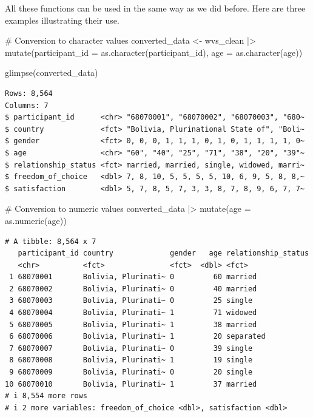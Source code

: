 \documentclass[
  letterpaper,
  DIV=11,
  numbers=noendperiod]{scrreprt}
\newenvironment{Shaded}{\begin{snugshade}}{\end{snugshade}}
\newcommand{\AttributeTok}[1]{\textcolor[rgb]{0.40,0.45,0.13}{#1}}
\newcommand{\CommentTok}[1]{\textcolor[rgb]{0.37,0.37,0.37}{#1}}
\newcommand{\FunctionTok}[1]{\textcolor[rgb]{0.28,0.35,0.67}{#1}}
\newcommand{\NormalTok}[1]{\textcolor[rgb]{0.00,0.23,0.31}{#1}}
\newcommand{\OtherTok}[1]{\textcolor[rgb]{0.00,0.23,0.31}{#1}}
\newcommand{\SpecialCharTok}[1]{\textcolor[rgb]{0.37,0.37,0.37}{#1}}
\begin{document}
All these functions can be used in the same way as we did before. Here
are three examples illustrating their use.

\begin{Shaded}
\begin{Highlighting}[]
\CommentTok{\# Conversion to character values}
\NormalTok{converted\_data }\OtherTok{\textless{}{-}}
\NormalTok{  wvs\_clean }\SpecialCharTok{|\textgreater{}}
  \FunctionTok{mutate}\NormalTok{(}\AttributeTok{participant\_id =} \FunctionTok{as.character}\NormalTok{(participant\_id),}
         \AttributeTok{age =} \FunctionTok{as.character}\NormalTok{(age))}

\FunctionTok{glimpse}\NormalTok{(converted\_data)}
\end{Highlighting}
\end{Shaded}

\begin{verbatim}
Rows: 8,564
Columns: 7
$ participant_id      <chr> "68070001", "68070002", "68070003", "680~
$ country             <fct> "Bolivia, Plurinational State of", "Boli~
$ gender              <fct> 0, 0, 0, 1, 1, 1, 0, 1, 0, 1, 1, 1, 1, 0~
$ age                 <chr> "60", "40", "25", "71", "38", "20", "39"~
$ relationship_status <fct> married, married, single, widowed, marri~
$ freedom_of_choice   <dbl> 7, 8, 10, 5, 5, 5, 5, 10, 6, 9, 5, 8, 8,~
$ satisfaction        <dbl> 5, 7, 8, 5, 7, 3, 3, 8, 7, 8, 9, 6, 7, 7~
\end{verbatim}

\begin{Shaded}
\begin{Highlighting}[]
\CommentTok{\# Conversion to numeric values}
\NormalTok{converted\_data }\SpecialCharTok{|\textgreater{}}
  \FunctionTok{mutate}\NormalTok{(}\AttributeTok{age =} \FunctionTok{as.numeric}\NormalTok{(age))}
\end{Highlighting}
\end{Shaded}

\begin{verbatim}
# A tibble: 8,564 x 7
   participant_id country             gender   age relationship_status
   <chr>          <fct>               <fct>  <dbl> <fct>              
 1 68070001       Bolivia, Plurinati~ 0         60 married            
 2 68070002       Bolivia, Plurinati~ 0         40 married            
 3 68070003       Bolivia, Plurinati~ 0         25 single             
 4 68070004       Bolivia, Plurinati~ 1         71 widowed            
 5 68070005       Bolivia, Plurinati~ 1         38 married            
 6 68070006       Bolivia, Plurinati~ 1         20 separated          
 7 68070007       Bolivia, Plurinati~ 0         39 single             
 8 68070008       Bolivia, Plurinati~ 1         19 single             
 9 68070009       Bolivia, Plurinati~ 0         20 single             
10 68070010       Bolivia, Plurinati~ 1         37 married            
# i 8,554 more rows
# i 2 more variables: freedom_of_choice <dbl>, satisfaction <dbl>
\end{verbatim}
\end{document}
